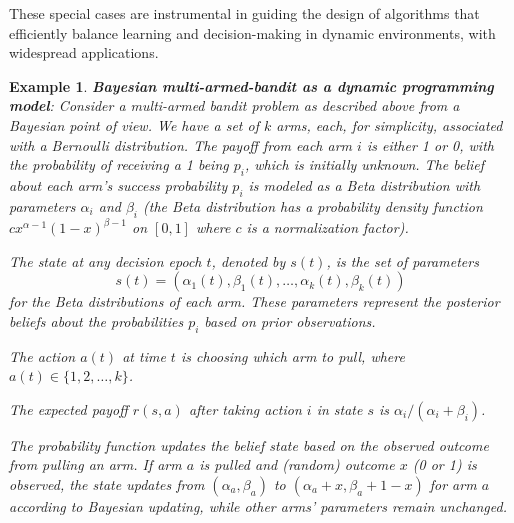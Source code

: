 \documentclass[letter,11pt]{article}
\newtheorem{example}{Example}[section]
\begin{document}
These special cases are instrumental in guiding the design of algorithms that efficiently balance learning and decision-making in dynamic environments, with widespread applications. 

\begin{example}
    \textbf{Bayesian multi-armed-bandit as a dynamic programming model}:
 Consider a multi-armed bandit problem as described above from a Bayesian point of view. We have a set of \( k \) arms, each, for simplicity, associated with a Bernoulli distribution. The payoff from each arm \( i \) is either 1 or 0, with the probability of receiving a 1 being \( p_i \), which is initially unknown. The belief about each arm's success probability \( p_i \) is modeled as a Beta distribution with parameters \(\alpha_i\) and \(\beta_i\) (the Beta distribution has a probability density function $cx^{\alpha-1}(1-x)^{\beta-1}$ on $[0,1]$ where $c$ is a normalization factor). 

The state at any decision epoch \( t \), denoted by \( s(t) \), is the set of parameters $$ s(t) = (\alpha_1(t), \beta_1(t), \ldots, \alpha_k(t), \beta_k(t)) $$ for the Beta distributions of each arm. These parameters represent the posterior beliefs about the probabilities \( p_i \) based on prior observations.
    
    The action \( a(t) \) at time \( t \) is choosing which arm to pull, where \( a(t) \in \{1, 2, \ldots, k\} \).

  The expected payoff \( r(s, a) \) after taking action \( i \) in state \( s \) is $\alpha_{i} / (\alpha_{i} + \beta_{i})$. 

   The probability function updates the belief state based on the observed outcome from pulling an arm. If arm \( a \) is pulled and (random) outcome \( x \) (0 or 1) is observed, the state updates from \( (\alpha_a, \beta_a) \) to \( (\alpha_a + x, \beta_a + 1 - x) \) for arm \( a \) according to Bayesian updating, while other arms' parameters remain unchanged.
    


\end{example}
\end{document}
